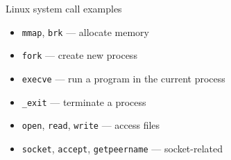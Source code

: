 \begin{frame}{Linux system call examples}
\begin{itemize}
\item {\tt mmap}, {\tt brk} --- allocate memory
\item {\tt fork} --- create new process
\item {\tt execve} --- run a program in the current process
\item {\tt \_exit} --- terminate a process
\item {\tt open}, {\tt read}, {\tt write} --- access files
\item {\tt socket}, {\tt accept}, {\tt getpeername} --- socket-related
\end{itemize}
\end{frame}

